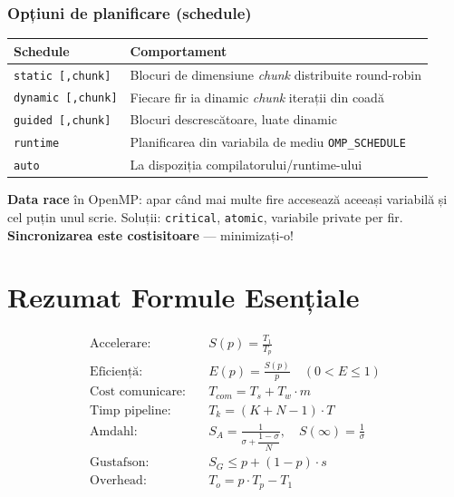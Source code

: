 \documentclass[a4paper,11pt]{article}
\newcommand{\thead}[1]{\cellcolor{tblheader}\color{white}\textbf{#1}}
\begin{document}
\subsubsection{Opțiuni de planificare (schedule)}

\begin{center}
\begin{tabularx}{\textwidth}{lX}
\toprule
\thead{Schedule} & \thead{Comportament} \\
\midrule
\lstinline|static [,chunk]| & Blocuri de dimensiune \textit{chunk} distribuite round-robin \\
\lstinline|dynamic [,chunk]| & Fiecare fir ia dinamic \textit{chunk} iterații din coadă \\
\lstinline|guided [,chunk]| & Blocuri descrescătoare, luate dinamic \\
\lstinline|runtime| & Planificarea din variabila de mediu \texttt{OMP\_SCHEDULE} \\
\lstinline|auto| & La dispoziția compilatorului/runtime-ului \\
\bottomrule
\end{tabularx}
\end{center}

\begin{tipbox}
\textbf{Data race} în OpenMP: apar când mai multe fire accesează aceeași variabilă și cel puțin unul scrie.
Soluții: \lstinline|critical|, \lstinline|atomic|, variabile private per fir. \textbf{Sincronizarea este costisitoare} — minimizați-o!
\end{tipbox}

\section{Rezumat Formule Esențiale}

\begin{formulabox}
\begin{align*}
\text{Accelerare:} \quad & S(p) = \frac{T_1}{T_p} \\[6pt]
\text{Eficiență:} \quad & E(p) = \frac{S(p)}{p} \quad (0 < E \leq 1) \\[6pt]
\text{Cost comunicare:} \quad & T_{com} = T_s + T_w \cdot m \\[6pt]
\text{Timp pipeline:} \quad & T_k = (K + N - 1) \cdot T \\[6pt]
\text{Amdahl:} \quad & S_A = \frac{1}{\sigma + \dfrac{1-\sigma}{N}}, \quad S(\infty) = \frac{1}{\sigma} \\[8pt]
\text{Gustafson:} \quad & S_G \leq p + (1-p) \cdot s \\[6pt]
\text{Overhead:} \quad & T_o = p \cdot T_p - T_1
\end{align*}
\end{formulabox}
\end{document}
